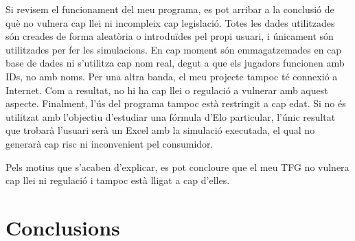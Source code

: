 \documentclass[a4paper]{article}
\begin{document}
Si revisem el funcionament del meu programa, es pot arribar a la conclusió de què no vulnera cap llei ni incompleix cap legislació. Totes les dades utilitzades són creades de forma aleatòria o introduïdes pel propi usuari, i únicament són utilitzades per fer les simulacions. En cap moment són emmagatzemades en cap base de dades ni s'utilitza cap nom real, degut a que els jugadors funcionen amb IDs, no amb noms. 
Per una altra banda, el meu projecte tampoc té connexió a Internet. Com a resultat, no hi ha cap llei o regulació a vulnerar amb aquest aspecte. Finalment, l'ús del programa tampoc està restringit a cap edat. Si no és utilitzat amb l'objectiu d'estudiar una fórmula d'Elo particular, l'únic resultat que trobarà l'usuari serà un Excel amb la simulació executada, el qual no generarà cap risc ni inconvenient pel consumidor.

Pels motius que s'acaben d'explicar, es pot concloure que el meu TFG no vulnera cap llei ni regulació i tampoc està lligat a cap d'elles.

\newpage
\section{Conclusions}
\end{document}
